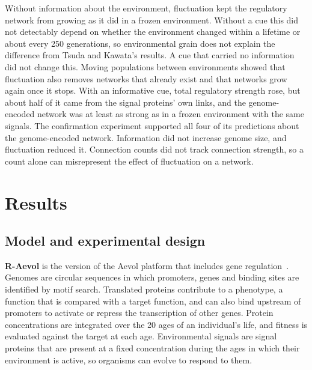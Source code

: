 \documentclass[10pt,letterpaper]{article}
\begin{document}
Without information about the environment, fluctuation kept the regulatory
network from growing as it did in a frozen environment. Without a cue this did
not detectably depend on whether the
environment changed within a lifetime or about every 250 generations, so
environmental grain does not explain the difference from Tsuda and Kawata's
results. A cue that carried no information did not change this. Moving populations
between environments showed that fluctuation also removes networks that already
exist and that networks grow again once it stops. With an
informative cue, total regulatory strength rose, but about half of it came from
the signal proteins' own links, and the genome-encoded network was at least as
strong as in a frozen environment with the same signals. The confirmation
experiment supported all four of its predictions about the genome-encoded
network. Information did not increase genome size, and
fluctuation reduced it. Connection counts did not track connection strength, so a
count alone can misrepresent the effect of fluctuation on a network.

\section*{Results}

\subsection*{Model and experimental design}

\textbf{R-Aevol} is the version of the Aevol platform that includes gene
regulation~\cite{sanchezdehesa2008,beslon2010,aevol9}. Genomes are circular
sequences in which promoters, genes and binding sites are identified by motif
search. Translated proteins contribute to a phenotype, a function that is
compared with a target function, and can also bind upstream of promoters to activate or repress the transcription of other genes. Protein concentrations are
integrated over the 20 ages of an individual's life, and fitness is evaluated
against the target at each age. Environmental signals are signal proteins that
are present at a fixed concentration during the ages in which their environment
is active, so organisms can evolve to respond to them.
\end{document}
